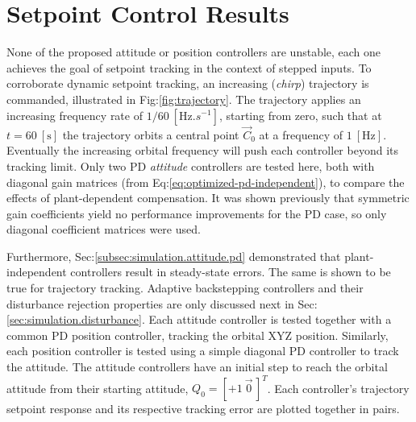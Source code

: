 \section{Setpoint Control Results}
\label{sec:simulation.autopilot}
None of the proposed attitude or position controllers are unstable, each one achieves the goal of setpoint tracking in the context of stepped inputs. To corroborate dynamic setpoint tracking, an increasing (\emph{chirp}) trajectory is commanded, illustrated in Fig:\ref{fig:trajectory}. The trajectory applies an increasing frequency rate of $1/60~[\text{Hz}.s^{-1}]$, starting from zero, such that at $t=60~[\text{s}]$ the trajectory orbits a central point $\vec{C}_0$ at a frequency of $1~[\text{Hz}]$. Eventually the increasing orbital frequency will push each controller beyond its tracking limit. Only two PD \emph{attitude} controllers are tested here, both with diagonal gain matrices (from Eq:\ref{eq:optimized-pd-independent}), to compare the effects of plant-dependent compensation. It was shown previously that symmetric gain coefficients yield no performance improvements for the PD case, so only diagonal coefficient matrices were used. 
\par
Furthermore, Sec:\ref{subsec:simulation.attitude.pd} demonstrated that plant-independent controllers result in steady-state errors. The same is shown to be true for trajectory tracking. Adaptive backstepping controllers and their disturbance rejection properties are only discussed next in Sec:\ref{sec:simulation.disturbance}. Each attitude controller is tested together with a common PD position controller, tracking the orbital XYZ position. Similarly, each position controller is tested using a simple diagonal PD controller to track the attitude. The attitude controllers have an initial step to reach the orbital attitude from their starting attitude, $Q_0=[+1~\vec{0}\hspace{2pt}]^T$. Each controller's trajectory setpoint response and its respective tracking error are plotted together in pairs.
